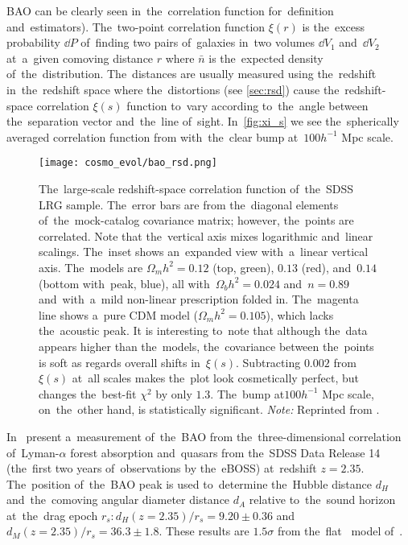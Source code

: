 BAO can be clearly seen in~the~correlation function \parencite[see e.g.][]{1993ApJ...412...64L} for~definition and~estimators). The~two-point correlation function $\xi(r)$ is the~excess probability $\dd P$ of~finding two pairs of~galaxies in~two volumes $\dd V_1$ and~$\dd V_2$ at~a~given comoving distance $r$
where $\bar{n}$ is the~expected density of~the~distribution. The~distances are usually measured using the~redshift in~the~redshift space where the~distortions (see \autoref{sec:rsd}) cause the~redshift-space correlation $\xi(s)$ function to~vary according to~the~angle between the~separation vector and~the~line of~sight. In~\autoref{fig:xi_s} we see the~spherically averaged correlation function from \textcite{2005ApJ...633..560E} with~the~clear bump at~$100h^{-1}$ Mpc scale.
\begin{figure}[!hbt]
    \centering
    \texttt{[image: cosmo\_evol/bao\_rsd.png]}
    \caption{The~large-scale redshift-space correlation function of~the~SDSS LRG sample. The~error bars are from the~diagonal elements of~the~mock-catalog covariance matrix; however, the~points are correlated. Note that the~vertical axis mixes logarithmic and~linear scalings. The~inset shows an~expanded view with~a~linear vertical axis. The~models are $\Omega_mh^2=0.12$ (top, green), $0.13$ (red), and~$0.14$ (bottom with~peak, blue), all with~$\Omega_bh^2=0.024$ and~$n=0.89$ and~with~a~mild non-linear prescription folded in. The~magenta line shows a~pure CDM model ($\Omega_mh^2=0.105$), which lacks the~acoustic peak. It is interesting to~note that although the~data appears higher than the~models, the~covariance between the~points is soft as regards overall shifts in~$\xi(s)$. Subtracting $0.002$ from $\xi(s)$ at~all scales makes the~plot look cosmetically perfect, but changes the~best-fit $\chi^2$ by only $1.3$. The~bump at$100h^{-1}$ Mpc scale, on~the~other hand, is statistically significant. \textit{Note:} Reprinted from \textcite{2005ApJ...633..560E}.}
    \label{fig:xi_s}
\end{figure}

In~\textcite{BAO_results} present a~measurement of~the~BAO from the~three-dimensional correlation of~Lyman-$\alpha$ forest absorption and~quasars from the~SDSS Data Release 14 (the~first two years of~observations by the~eBOSS) at~redshift $z=2.35$. The~position of~the~BAO peak is used to~determine the~Hubble distance $d_H$ and~the~comoving angular diameter distance $d_A$ relative to~the~sound horizon at~the~drag epoch $r_s: d_H(z=2.35)/r_s = 9.20\pm0.36$ and~$d_M(z=2.35)/r_s = 36.3\pm1.8$. These results are $1.5\sigma$ from the~flat \LCDM\ model of~\textcite{2016A&A...594A..13P}.
